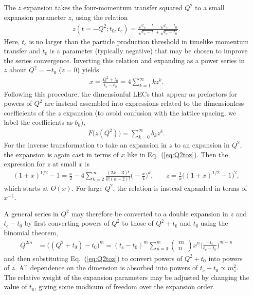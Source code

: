 \documentclass{ar-1col}
\begin{document}
The $z$ expansion takes the four-momentum transfer squared $Q^2$
 to a small expansion parameter $z$, using the relation
\begin{align}
 z(t=-Q^2;t_0,t_c) = \frac{\sqrt{t_c-t} -\sqrt{t_c-t_0}}{ \sqrt{t_c-t} +\sqrt{t_c-t_0}}.
\end{align}
Here, $t_c$ is no larger than the particle production threshold in timelike momentum transfer
 and $t_0$ is a parameter (typically negative) that
 may be chosen to improve the series convergence.
Inverting this relation and expanding as a power series in $z$ about $Q^2=-t_0$ ($z=0$) yields
\begin{align}
x =  \frac{Q^2+t_0}{t_c-t_0} = 4 \sum_{k=1}^\infty k z^k.
 \label{eq:Q2toz}
\end{align}
Following this procedure, the dimensionful LECs that appear as prefactors for powers of $Q^2$
 are instead assembled into expressions related to the dimensionless
 coefficients of the $z$ expansion (to avoid confusion with the lattice spacing, we label the coefficients as $b_k$),
\begin{align}
 F\big(z(Q^2)\big) = \sum_{k=0}^\infty b_k z^k.
 \label{eq:zexp}
\end{align}
%
For the inverse transformation to take an expansion in $z$ to an expansion in $Q^2$,
 the expansion is again cast in terms of $x$
like in Eq.~(\ref{eq:Q2toz}).
Then the expression for $z$ at small $x$ is
\begin{align}
 (1+x)^{1/2} -1 = \frac{x}{2}
 -4\sum_{k=2}^\infty \frac{(2k-3)!}{k!(k-2)!} \biggr( -\frac{x}{4} \biggr)^{k},
 &\quad
 z = \frac{1}{x} \big( (1+x)^{1/2} -1 \big)^2,
 \label{eq:ztoQ2}
\end{align}
 which starts at $O(x)$.
For large $Q^2$, the relation is instead expanded in terms of $x^{-1}$.

A general series in $Q^2$ may therefore be converted to a double expansion in $z$ and $t_c-t_0$
 by first converting powers of $Q^2$ to those of $Q^2+t_0$ and $t_0$ using the  binomial theorem,
\begin{align}
 Q^{2m} &= \big( (Q^2+t_0) -t_0 \big)^m
 = (t_c-t_0)^m
 \sum_{n=0}^{m} \left( \begin{array}{c} m \\ n \end{array} \right)
 x^n
 \biggr( \frac{-t_0}{t_c-t_0} \biggr)^{m-n}
\end{align}
 and then substituting Eq.~(\ref{eq:Q2toz}) to convert powers of $Q^2+t_0$
 into powers of $z$.
All dependence on the dimension is absorbed into powers of $t_c-t_0 \propto m_\pi^2$.
The relative weight of the expansion parameters may be adjusted by changing
 the value of $t_0$, giving some modicum of freedom over the expansion order.
\end{document}
